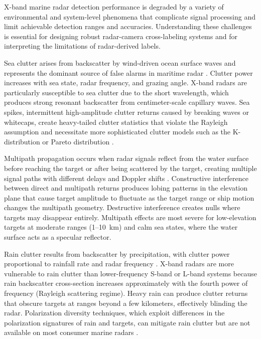 X-band marine radar detection performance is degraded by a variety of environmental and system-level phenomena that complicate signal processing and limit achievable detection ranges and accuracies. Understanding these challenges is essential for designing robust radar-camera cross-labeling systems and for interpreting the limitations of radar-derived labels.

Sea clutter arises from backscatter by wind-driven ocean surface waves and represents the dominant source of false alarms in maritime radar \cite{Ward2006}. Clutter power increases with sea state, radar frequency, and grazing angle. X-band radars are particularly susceptible to sea clutter due to the short wavelength, which produces strong resonant backscatter from centimeter-scale capillary waves. Sea spikes, intermittent high-amplitude clutter returns caused by breaking waves or whitecaps, create heavy-tailed clutter statistics that violate the Rayleigh assumption and necessitate more sophisticated clutter models such as the K-distribution or Pareto distribution \cite{Watts2022}.

Multipath propagation occurs when radar signals reflect from the water surface before reaching the target or after being scattered by the target, creating multiple signal paths with different delays and Doppler shifts \cite{Rosenberg2013}. Constructive interference between direct and multipath returns produces lobing patterns in the elevation plane that cause target amplitude to fluctuate as the target range or ship motion changes the multipath geometry. Destructive interference creates nulls where targets may disappear entirely. Multipath effects are most severe for low-elevation targets at moderate ranges (1--10~km) and calm sea states, where the water surface acts as a specular reflector.

Rain clutter results from backscatter by precipitation, with clutter power proportional to rainfall rate and radar frequency \cite{Skolnik2008}. X-band radars are more vulnerable to rain clutter than lower-frequency S-band or L-band systems because rain backscatter cross-section increases approximately with the fourth power of frequency (Rayleigh scattering regime). Heavy rain can produce clutter returns that obscure targets at ranges beyond a few kilometers, effectively blinding the radar. Polarization diversity techniques, which exploit differences in the polarization signatures of rain and targets, can mitigate rain clutter but are not available on most consumer marine radars \cite{Humphreys2022}.

